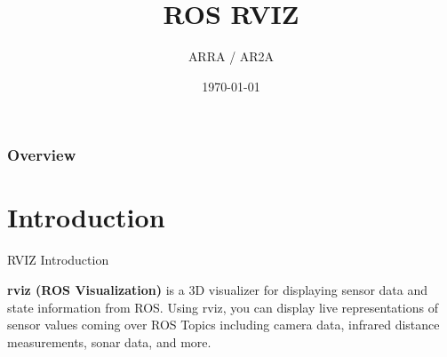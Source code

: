 \documentclass{beamer}
\title[]{ROS RVIZ} %
\author{ARRA / AR2A} %
\institute %
{
\textbf{A}dvancements for \textbf{R}obotics in \textbf{R}escue \textbf{A}pplications
}
\date{\today} %
\begin{document}
\begin{frame}
\titlepage %
\end{frame}

\begin{frame}
\frametitle{Overview} %
\tableofcontents %
\end{frame}



\section{Introduction}

\begin{frame}{RVIZ Introduction}	

	\begin{definition}
		\textbf{rviz (ROS Visualization)} is a 3D visualizer for displaying sensor data and state information from ROS. Using rviz, you can display live representations of sensor values coming over ROS Topics including camera data, infrared distance measurements, sonar data, and more. 
	
	\end{definition}
\end{frame}
\end{document}
